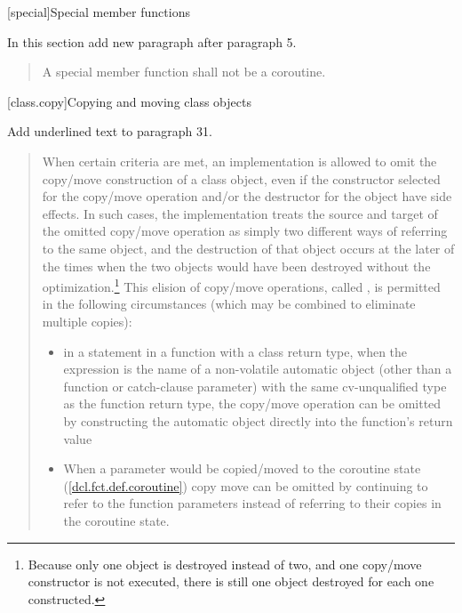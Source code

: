 
\setcounter{chapter}{11}
[special]{Special member functions}

In this section add new paragraph after paragraph 5.

\begin{quote}
	\setcounter{Paras}{5}
	\pnum
	A special member function shall not be a coroutine.
\end{quote}

\setcounter{section}{7}
[class.copy]{Copying and moving class objects}%


Add underlined text to paragraph 31.

\begin{quote}
\setcounter{Paras}{30}
\pnum
{}%
%
%
%
%
When certain criteria are met, an implementation is
allowed to omit the copy/move construction of a class object,
even if the constructor selected for the copy/move operation and/or the
destructor for the object have
%
side effects.  In such cases, the
implementation treats the source and target of the
omitted copy/move operation as simply two different ways of
referring to the same object, and the destruction of
that object occurs at the later of the times when the
two objects would have been destroyed without the
optimization.\footnote{Because only one object is destroyed instead of two,
  and one copy/move constructor
  is not executed, there is still one object destroyed for each one constructed.}
This elision of copy/move operations, called
%
%
,
is permitted in the
following circumstances (which may be combined to
eliminate multiple copies):

\begin{itemize}
  \item in a  statement in a function with a class return type,
  when the expression is the name of a non-volatile
  automatic object
  (other than a function or catch-clause parameter)
  with the same cv-unqualified type as
  the function return type, the copy/move operation can be
  omitted by constructing the automatic object directly
  into the function's return value
  \item
  When a parameter would be copied/moved to the coroutine state (\ref{dcl.fct.def.coroutine}) copy move can be omitted by continuing to refer to the function parameters instead of referring to their copies in the coroutine state.
\end{itemize}
\end{quote}